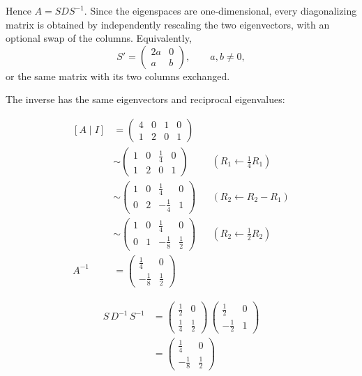 \documentclass[11pt]{article}
\begin{document}
Hence \(A=SDS^{-1}\). Since the eigenspaces are one-dimensional, every diagonalizing matrix is obtained by independently rescaling the two eigenvectors, with an optional swap of the columns. Equivalently,
\[S'=\begin{pmatrix}2a&0\\a&b\end{pmatrix},\qquad a,b\ne0,\]
or the same matrix with its two columns exchanged.

The inverse has the same eigenvectors and reciprocal eigenvalues:

\[\begin{aligned}\left[A\mid I\right] &= \begin{pmatrix}4 & 0 & 1 & 0 \\ 1 & 2 & 0 & 1\end{pmatrix} \\
&\sim \begin{pmatrix}1 & 0 & \frac{1}{4} & 0 \\ 1 & 2 & 0 & 1\end{pmatrix} && \left(R_{1}\leftarrow \frac{1}{4}R_{1}\right) \\
&\sim \begin{pmatrix}1 & 0 & \frac{1}{4} & 0 \\ 0 & 2 & -\frac{1}{4} & 1\end{pmatrix} && \left(R_{2}\leftarrow R_{2}-R_{1}\right) \\
&\sim \begin{pmatrix}1 & 0 & \frac{1}{4} & 0 \\ 0 & 1 & -\frac{1}{8} & \frac{1}{2}\end{pmatrix} && \left(R_{2}\leftarrow \frac{1}{2}R_{2}\right) \\
A^{-1} &= \begin{pmatrix}\frac{1}{4} & 0 \\ -\frac{1}{8} & \frac{1}{2}\end{pmatrix}\end{aligned}\]

\[\begin{aligned}S\,D^{-1}\,S^{-1} &= \begin{pmatrix}\frac{1}{2} & 0 \\ \frac{1}{4} & \frac{1}{2}\end{pmatrix}\,\begin{pmatrix}\frac{1}{2} & 0 \\ -\frac{1}{2} & 1\end{pmatrix} \\
&= \begin{pmatrix}\frac{1}{4} & 0 \\ -\frac{1}{8} & \frac{1}{2}\end{pmatrix}\end{aligned}\]
\end{document}
